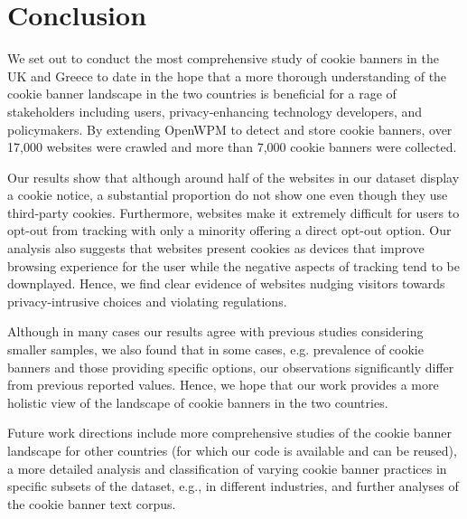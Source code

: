 \section{Conclusion}


We set out to conduct the most comprehensive study of cookie banners in the UK and Greece to date in the hope that a more thorough understanding of the cookie banner landscape in the two countries is beneficial for a rage of stakeholders including users, privacy-enhancing technology developers, and policymakers.
By extending OpenWPM to detect and store cookie banners, over 17,000 websites were crawled and more than 7,000 cookie banners were collected. 

Our results show that although around half of the websites in our dataset display a cookie notice, a substantial proportion do not show one even though they use third-party cookies. 
Furthermore, websites make it extremely difficult for users to opt-out from tracking with only a minority offering a direct opt-out option. 
Our analysis also suggests that websites present cookies as devices that improve browsing experience for the user while the negative aspects of tracking tend to be downplayed. 
Hence, we find clear evidence of websites nudging visitors towards privacy-intrusive choices and violating regulations. 

Although in many cases our results agree with previous studies considering smaller samples, we also found that in some cases, e.g. prevalence of cookie banners and those providing specific options, our observations significantly differ from previous reported values. 
Hence, we hope that our work provides a more holistic view of the landscape of cookie banners in the two countries. 

Future work directions include more comprehensive studies of the cookie banner landscape for other countries (for which our code is available and can be reused), a more detailed analysis and classification of varying cookie banner practices in specific subsets of the dataset, e.g., in different industries, and further analyses of the cookie banner text corpus. 